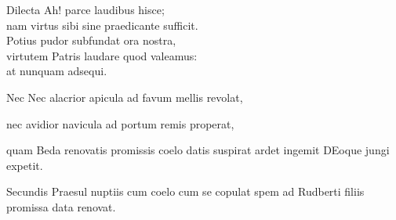 \documentclass[tocstyle=ref-genre]{ees}
\begin{document}
{\begin{movement}{Dilecta}
  Ah! parce laudibus hisce;\\
  nam virtus sibi sine praedicante sufficit.\\
  Potius pudor subfundat ora nostra,\\
  virtutem Patris laudare quod valeamus:\\
  at nunquam adsequi.
\end{movement}

\begin{movement}{Nec}
  Nec alacrior apicula
  ad favum mellis revolat,

  nec avidior navicula
  ad portum remis properat,

  \voice[both]
  quam Beda renovatis
  promissis coelo datis
  suspirat ardet ingemit
  DEoque jungi expetit.

  Secundis Praesul nuptiis
  cum coelo cum se copulat
  spem ad Rudberti filiis
  promissa data renovat.
\end{movement}


}

\eesScore
\end{document}
